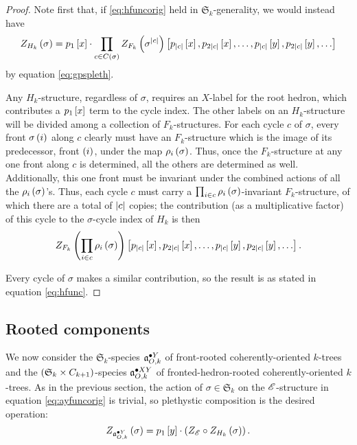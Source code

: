 \documentclass[sectionflow,singlespace,twoside]{brandiss} %
\numberwithin{section}{chapter}
\numberwithin{figure}{chapter}
\begin{document}
\begin{proof}
  Note first that, if \eqref{eq:hfuncorig} held in $\mathfrak{S}_{k}$-generality, we would instead have
  \begin{equation*}
    Z_{H_{k}} \pbrac{\sigma} = p_{1} \sbrac{x} \cdot \prod_{c \in C \pbrac{\sigma}} Z_{F_{k}} \pbrac{\sigma^{\abs{c}}} \sbrac{p_{\abs{c}} \sbrac{x}, p_{2 \abs{c}} \sbrac{x}, \dots, p_{\abs{c}} \sbrac{y}, p_{2 \abs{c}} \sbrac{y}, \dots}
  \end{equation*}
  by equation \eqref{eq:gpspleth}.

  Any $H_{k}$-structure, regardless of $\sigma$, requires an $X$-label for the root hedron, which contributes a $p_{1} \sbrac{x}$ term to the cycle index.
  The other labels on an $H_{k}$-structure will be divided among a collection of $F_{k}$-structures.
  For each cycle $c$ of $\sigma$, every front $\sigma \pbrac{i}$ along $c$ clearly must have an $F_{k}$-structure which is the image of its predecessor, front $\pbrac{i}$, under the map $\rho_{i} \pbrac{\sigma}$.
  Thus, once the $F_{k}$-structure at any one front along $c$ is determined, all the others are determined as well.
  Additionally, this one front must be invariant under the combined actions of all the $\rho_{i} \pbrac{\sigma}$'s.
  Thus, each cycle $c$ must carry a $\prod_{i \in c} \rho_{i} \pbrac{\sigma}$-invariant $F_{k}$-structure, of which there are a total of $\abs{c}$ copies; the contribution (as a multiplicative factor) of this cycle to the $\sigma$-cycle index of $H_{k}$ is then
  \begin{equation*}
    Z_{F_{k}} \pbrac{\prod_{i \in c} \rho_{i} \pbrac{\sigma}} \sbrac{p_{\abs{c}} \sbrac{x}, p_{2 \abs{c}} \sbrac{x}, \dots, p_{\abs{c}} \sbrac{y}, p_{2 \abs{c}} \sbrac{y}, \dots}.
  \end{equation*}

  Every cycle of $\sigma$ makes a similar contribution, so the result is as stated in equation \eqref{eq:hfunc}.
\end{proof}

\subsection{Rooted components}\label{ss:ktcycindroot}
We now consider the $\mathfrak{S}_{k}$-species $\pointed[Y]{\mathfrak{a}}_{O, k}$ of front-rooted coherently-oriented $k$-trees and the $\pbrac{\mathfrak{S}_{k} \times C_{k+1}}$-species $\pointed[XY]{\mathfrak{a}}_{O, k}$ of fronted-hedron-rooted coherently-oriented $k$-trees.
As in the previous section, the action of $\sigma \in \mathfrak{S}_{k}$ on the $\specname{E}$-structure in equation \eqref{eq:ayfuncorig} is trivial, so plethystic composition is the desired operation:
\begin{equation}
  \label{eq:ayfunc}
  Z_{\pointed[Y]{\mathfrak{a}}_{O, k}} \pbrac{\sigma} = p_{1} \sbrac{y} \cdot \pbrac{Z_{\specname{E}} \circ Z_{H_{k}} \pbrac{\sigma}}.
\end{equation}
\end{document}
